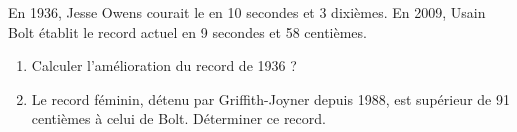 \begin{exercice*}
   En 1936, Jesse Owens courait le  en 10 secondes et 3 dixièmes. En 2009, Usain Bolt établit le record actuel en 9 secondes et 58 centièmes.
   \begin{enumerate}
      \item Calculer l'amélioration du record de 1936 ?
      \item Le record féminin, détenu par Griffith-Joyner depuis 1988, est supérieur de 91 centièmes à celui de Bolt. Déterminer ce record.
   \end{enumerate}
\end{exercice*}